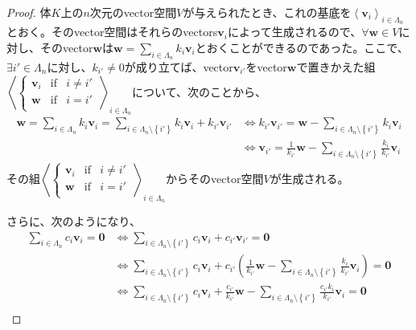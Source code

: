 \documentclass[dvipdfmx]{jsarticle}
\begin{document}
\begin{proof}
体$K$上の$n$次元のvector空間$V$が与えられたとき、これの基底を$\left\langle \mathbf{v}_{i} \right\rangle_{i \in \varLambda_{n}}$とおく。そのvector空間はそれらのvectors$\mathbf{v}_{i}$によって生成されるので、$\forall\mathbf{w} \in V$に対し、そのvector$\mathbf{w}$は$\mathbf{w} = \sum_{i \in \varLambda_{n}} {k_{i}\mathbf{v}_{i}}$とおくことができるのであった。ここで、$\exists i' \in \varLambda_{n}$に対し、$k_{i'} \neq 0$が成り立てば、vector$\mathbf{v}_{i'}$をvector$\mathbf{w}$で置きかえた組$\left\langle \left\{ \begin{matrix}
\mathbf{v}_{i} & \mathrm{if}  & i \neq i' \\
\mathbf{w} & \mathrm{if}  & i = i' \\
\end{matrix} \right.\  \right\rangle_{i \in \varLambda_{n}}$について、次のことから、
\begin{align*}
\mathbf{w} = \sum_{i \in \varLambda_{n}} {k_{i}\mathbf{v}_{i}} = \sum_{i \in \varLambda_{n} \setminus \left\{ i' \right\}} {k_{i}\mathbf{v}_{i}} + k_{i'}\mathbf{v}_{i'} &\Leftrightarrow k_{i'}\mathbf{v}_{i'} = \mathbf{w} - \sum_{i \in \varLambda_{n} \setminus \left\{ i' \right\}} {k_{i}\mathbf{v}_{i}}\\
&\Leftrightarrow \mathbf{v}_{i'} = \frac{1}{k_{i'}}\mathbf{w} - \sum_{i \in \varLambda_{n} \setminus \left\{ i' \right\}} {\frac{k_{i}}{k_{i'}}\mathbf{v}_{i}}
\end{align*}
その組$\left\langle \left\{ \begin{matrix}
\mathbf{v}_{i} & \mathrm{if}  & i \neq i' \\
\mathbf{w} & \mathrm{if}  & i = i' \\
\end{matrix} \right.\  \right\rangle_{i \in \varLambda_{n}}$からそのvector空間$V$が生成される。\par
さらに、次のようになり、
\begin{align*}
\sum_{i \in \varLambda_{n}} {c_{i}\mathbf{v}_{i}} = \mathbf{0} &\Leftrightarrow \sum_{i \in \varLambda_{n} \setminus \left\{ i' \right\}} {c_{i}\mathbf{v}_{i}} + c_{i'}\mathbf{v}_{i'} = \mathbf{0}\\
&\Leftrightarrow \sum_{i \in \varLambda_{n} \setminus \left\{ i' \right\}} {c_{i}\mathbf{v}_{i}} + c_{i'}\left( \frac{1}{k_{i'}}\mathbf{w} - \sum_{i \in \varLambda_{n} \setminus \left\{ i' \right\}} {\frac{k_{i}}{k_{i'}}\mathbf{v}_{i}} \right) = \mathbf{0}\\
&\Leftrightarrow \sum_{i \in \varLambda_{n} \setminus \left\{ i' \right\}} {c_{i}\mathbf{v}_{i}} + \frac{c_{i'}}{k_{i'}}\mathbf{w} - \sum_{i \in \varLambda_{n} \setminus \left\{ i' \right\}} {\frac{c_{i'}k_{i}}{k_{i'}}\mathbf{v}_{i}} = \mathbf{0}\\

\end{align*}
\end{proof}
\end{document}
